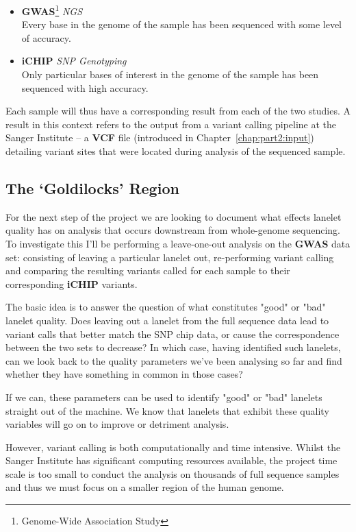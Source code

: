 \begin{itemize}
    \item \textbf{GWAS}\footnote{Genome-Wide Association Study} \textit{NGS}\hfill\\
        Every base in the genome of the sample has been sequenced with some
        level of accuracy.
    \item \textbf{iCHIP} \textit{SNP Genotyping}\hfill\\
        Only particular bases of interest in the genome of the sample has been
        sequenced with high accuracy.
\end{itemize}

Each sample will thus have a corresponding result from each of the two studies.
A result in this context refers to the output from a variant calling pipeline
at the Sanger Institute -- a \textbf{VCF} file (introduced in
Chapter~\ref{chap:part2:input}) detailing variant sites that were located during
analysis of the sequenced sample.


\subsection{The `Goldilocks' Region}

For the next step of the project we are looking to document what effects lanelet
quality has on analysis that occurs downstream from whole-genome sequencing. To
investigate this I'll be performing a leave-one-out analysis on the
\textbf{GWAS} data set: consisting of leaving a particular lanelet out,
re-performing variant calling and comparing the resulting variants called for
each sample to their corresponding \textbf{iCHIP} variants.

The basic idea is to answer the question of what constitutes "good" or
"bad" lanelet quality. Does leaving out a lanelet from the full sequence data
lead to variant calls that better match the SNP chip data, or cause the
correspondence between the two sets to decrease? In which case, having
identified such lanelets, can we look back to the quality parameters we’ve been
analysing so far and find whether they have something in common in those cases?

If we can, these parameters can be used to identify "good" or "bad" lanelets
straight out of the machine. We know that lanelets that exhibit these quality
variables will go on to improve or detriment analysis.

However, variant calling is both computationally and time intensive. Whilst the
Sanger Institute has significant computing resources available, the project time
scale is too small to conduct the analysis on thousands of full sequence samples
and thus we must focus on a smaller region of the human genome.

